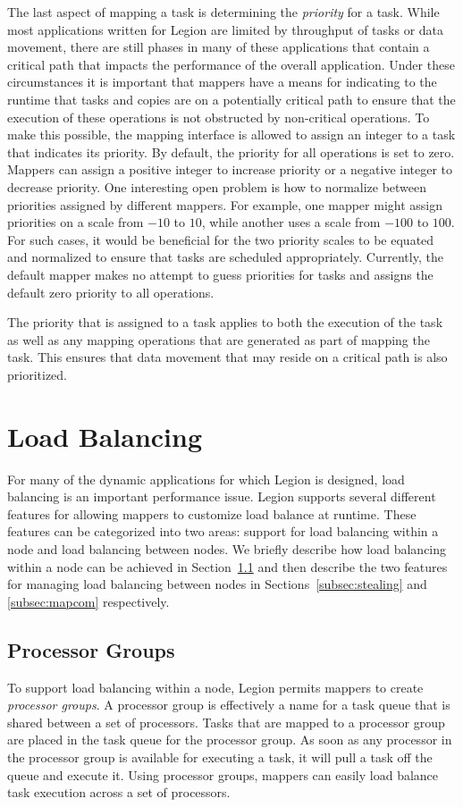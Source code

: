 The last aspect of mapping a task is determining the
{\em priority} for a task.  While most applications
written for Legion are limited by throughput of 
tasks or data movement, there are still phases in
many of these applications that contain a critical
path that impacts the performance of the overall
application.  Under these circumstances it is important
that mappers have a means for indicating to the
runtime that tasks and copies are on a potentially
critical path to ensure that the execution of these
operations is not obstructed by non-critical 
operations. To make this possible, the mapping interface
is allowed to assign an integer to a task that 
indicates its priority. By default, the priority
for all operations is set to zero. Mappers can assign
a positive integer to increase priority or a negative
integer to decrease priority. One interesting open
problem is how to normalize between priorities
assigned by different mappers.  For example, one
mapper might assign priorities on a scale from $-10$ 
to $10$, while another uses a scale from $-100$ to 
$100$. For such cases, it would be beneficial
for the two priority scales to be equated and normalized
to ensure that tasks are scheduled appropriately.
Currently, the default mapper makes no attempt to
guess priorities for tasks and assigns the default 
zero priority to all operations.

The priority that is assigned to a task applies to both
the execution of the task as well as any mapping 
operations that are generated as part of mapping the
task.  This ensures that data movement that may 
reside on a critical path is also prioritized.


\section{Load Balancing}
\label{sec:loadbalance}
For many of the dynamic applications for which 
Legion is designed, load balancing is an important 
performance issue.  Legion supports several different
features for allowing mappers to customize load
balance at runtime. These features can be 
categorized into two areas: support for load
balancing within a node and load balancing 
between nodes. We briefly describe how load
balancing within a node can be achieved in
Section~\ref{subsec:procgroups} and then describe
the two features for managing load balancing
between nodes in Sections~\ref{subsec:stealing}
and \ref{subsec:mapcom} respectively.

\subsection{Processor Groups}
\label{subsec:procgroups}
To support load balancing within a node, Legion
permits mappers to create {\em processor groups}.
A processor group is effectively a name for a
task queue that is shared between a set of
processors. Tasks that are mapped to a processor
group are placed in the task queue for the processor
group. As soon as any processor in the processor
group is available for executing a task, it will
pull a task off the queue and execute it. Using
processor groups, mappers can easily load balance
task execution across a set of processors.


